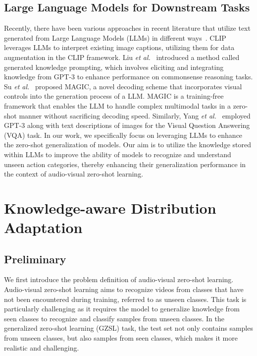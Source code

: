 \documentclass[10pt,twocolumn,letterpaper]{article}
\begin{document}
\subsection{Large Language Models for Downstream Tasks}
Recently, there have been various approaches in recent literature that utilize text generated from Large Language Models (LLMs) in different ways~\cite{santurkar2022caption,KP4cr,hu2022knowledgeable,yu2022multimodal,su2022language,yang2022empirical}. CLIP~\cite{santurkar2022caption} leverages LLMs to interpret existing image captions, utilizing them for data augmentation in the CLIP framework. Liu \textit{et al.}~\cite{KP4cr} introduced a method called generated knowledge prompting, which involves eliciting and integrating knowledge from GPT-3 to enhance performance on commonsense reasoning tasks.
Su \textit{et al.}~\cite{su2022language} proposed MAGIC, a novel decoding scheme that incorporates visual controls into the generation process of a LLM. MAGIC is a training-free framework that enables the LLM to handle complex multimodal tasks in a zero-shot manner without sacrificing decoding speed. Similarly, Yang \textit{et al.}~\cite{yang2022empirical} employed GPT-3 along with text descriptions of images for the Visual Question Answering (VQA) task.
In our work, we specifically focus on leveraging LLMs to enhance the zero-shot generalization of models. Our aim is to utilize the knowledge stored within LLMs to improve the ability of models to recognize and understand unseen action categories, thereby enhancing their generalization performance in the context of audio-visual zero-shot learning.

\section{Knowledge-aware Distribution Adaptation}
\subsection{Preliminary}
We first introduce the problem definition of audio-visual zero-shot learning.
Audio-visual zero-shot learning aims to recognize videos from classes that have not been encountered during training, referred to as unseen classes. This task is particularly challenging as it requires the model to generalize knowledge from seen classes to recognize and classify samples from unseen classes.
In the generalized zero-shot learning (GZSL) task, the test set not only contains samples from unseen classes, but also samples from seen classes, which makes it more realistic and challenging. 
\end{document}
